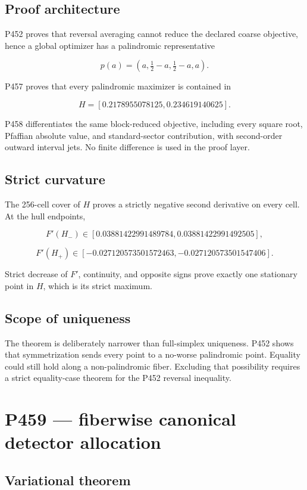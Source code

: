 \documentclass[11pt,a4paper,openany]{report}
\begin{document}
\section{Proof architecture}

P452 proves that reversal averaging cannot reduce the declared coarse objective, hence a global optimizer has a palindromic representative

\[
p(a)=(a,\tfrac12-a,\tfrac12-a,a).
\]

P457 proves that every palindromic maximizer is contained in

\[
H=[0.2178955078125,0.234619140625].
\]

P458 differentiates the same block-reduced objective, including every square root, Pfaffian absolute value, and standard-sector contribution, with second-order outward interval jets. No finite difference is used in the proof layer.

\section{Strict curvature}

The 256-cell cover of \(H\) proves a strictly negative second derivative on every cell. At the hull endpoints,

\[
F'(H_- )\in[0.03881422991489784,0.03881422991492505],
\]

\[
F'(H_+ )\in[-0.027120573501572463,-0.027120573501547406].
\]

Strict decrease of \(F'\), continuity, and opposite signs prove exactly one stationary point in \(H\), which is its strict maximum.

\section{Scope of uniqueness}

The theorem is deliberately narrower than full-simplex uniqueness. P452 shows that symmetrization sends every point to a no-worse palindromic point. Equality could still hold along a non-palindromic fiber. Excluding that possibility requires a strict equality-case theorem for the P452 reversal inequality.

\chapter{P459 --- fiberwise canonical detector allocation}

\section{Variational theorem}
\end{document}
